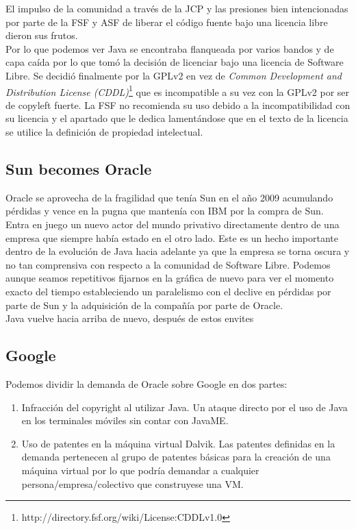 \documentclass[11pt]{scrartcl}
\begin{document}
El impulso de la comunidad a través de la JCP y las presiones bien intencionadas por parte de la FSF y ASF de liberar el código fuente bajo una licencia libre dieron sus frutos.\\
Por lo que podemos ver Java se encontraba flanqueada por varios bandos y de capa caída por lo que tomó la decisión de licenciar bajo una licencia de Software Libre. Se decidió finalmente por la GPLv2 en vez de \emph{Common Development and Distribution License (CDDL)}\footnote{http://directory.fsf.org/wiki/License:CDDLv1.0} que es incompatible a su vez con la GPLv2 por ser de copyleft fuerte. La FSF no recomienda su uso debido a la incompatibilidad con su licencia y el apartado que le dedica lamentándose que en el texto de la licencia se utilice la definición de propiedad intelectual.\\

\subsection{Sun becomes Oracle}

Oracle se aprovecha de la fragilidad que tenía Sun en el año 2009 acumulando pérdidas y vence en la pugna que mantenía con IBM por la compra de Sun. Entra en juego un nuevo actor del mundo privativo directamente dentro de una empresa que siempre había estado en el otro lado. Este es un hecho importante dentro de la evolución de Java hacia adelante ya que la empresa se torna oscura y no tan comprensiva con respecto a la comunidad de Software Libre. Podemos aunque seamos repetitivos fijarnos en la gráfica de nuevo para ver el momento exacto del tiempo estableciendo un paralelismo con el declive en pérdidas por parte de Sun y la adquisición de la compañía por parte de Oracle.\\
Java vuelve hacia arriba de nuevo, después de estos envites 

\subsection{Google}

Podemos dividir la demanda de Oracle sobre Google en dos partes:
\begin{enumerate}
    \item Infracción del copyright al utilizar Java. Un ataque directo por el uso de Java en los terminales móviles sin contar con JavaME.
    \item Uso de patentes en la máquina virtual Dalvik. Las patentes definidas en la demanda pertenecen al grupo de patentes básicas para la creación de una máquina virtual por lo que podría demandar a cualquier persona/empresa/colectivo que construyese una VM.
\end{enumerate}
\end{document}
